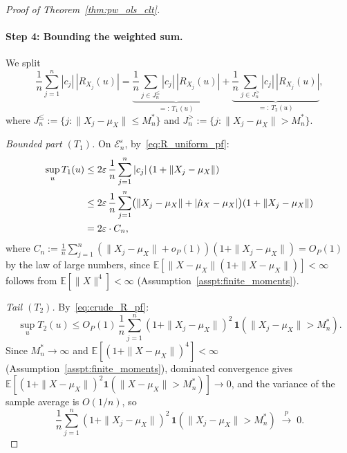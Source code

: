 \documentclass[12pt]{article}
\newcommand{\E}{\mathbb{E}}
\newcommand{\toP}{ \overset{p}{\to}}
\begin{document}
\begin{proof}[Proof of Theorem~\ref{thm:pw_ols_clt}]
\paragraph{Step 4: Bounding the weighted sum.}
We split
\[
\frac{1}{n}\sum_{j=1}^n|c_j|\,|R_{X_j}(u)|
=\underbrace{\frac{1}{n}\sum_{j\in J_n^{\le}}|c_j|\,|R_{X_j}(u)|}_{=:\,T_1(u)}
+\underbrace{\frac{1}{n}\sum_{j\in J_n^{>}}|c_j|\,|R_{X_j}(u)|}_{=:\,T_2(u)},
\]
where $J_n^{\le}:=\{j:\|X_j-\mu_X\|\le M_n^*\}$ and $J_n^{>}:=\{j:\|X_j-\mu_X\|> M_n^*\}$.
 
\smallskip\noindent\textit{Bounded part $(T_1)$.} On $\mathcal{E}_n^\varepsilon$, by~\eqref{eq:R_uniform_pf}:
\begin{align}
\sup_u T_1(u)
&\le 2\varepsilon\,\frac{1}{n}\sum_{j=1}^n|c_j|\,(1+\|X_j-\mu_X\|) \notag\\
&\le 2\varepsilon\,\frac{1}{n}\sum_{j=1}^n\bigl(\|X_j-\mu_X\|+|\hat\mu_X-\mu_X|\bigr)(1+\|X_j-\mu_X\|) \notag\\
&= 2\varepsilon\cdot C_n, \label{eq:T1_pf}
\end{align}
where $C_n:=\frac{1}{n}\sum_{j=1}^n(\|X_j-\mu_X\|+o_P(1))(1+\|X_j-\mu_X\|)=O_P(1)$ by the law of large numbers, since $\E[\|X-\mu_X\|(1+\|X-\mu_X\|)]<\infty$ follows from $\E[\|X\|^4]<\infty$ (Assumption~\ref{asspt:finite_moments}).
 
\smallskip\noindent\textit{Tail $(T_2)$.} By~\eqref{eq:crude_R_pf}:
\begin{equation}\label{eq:T2_pf}
\sup_u T_2(u)
\le O_P(1)\,\frac{1}{n}\sum_{j=1}^n(1+\|X_j-\mu_X\|)^2\,\mathbf{1}(\|X_j-\mu_X\|>M_n^*).
\end{equation}
Since $M_n^*\to\infty$ and $\E[(1+\|X-\mu_X\|)^4]<\infty$ (Assumption~\ref{asspt:finite_moments}), dominated convergence gives $\E[(1+\|X-\mu_X\|)^2\mathbf{1}(\|X-\mu_X\|>M_n^*)]\to 0$, and the variance of the sample average is $O(1/n)$, so
\begin{equation}\label{eq:tail_vanish_pf}
\frac{1}{n}\sum_{j=1}^n(1+\|X_j-\mu_X\|)^2\,\mathbf{1}(\|X_j-\mu_X\|>M_n^*)\;\toP\;0.
\end{equation}
 

\end{proof}
\end{document}
